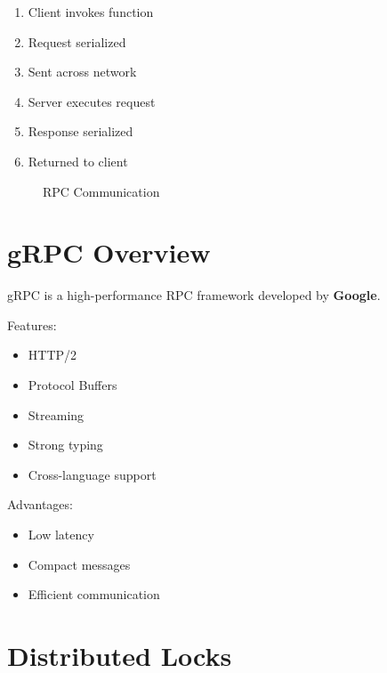 \begin{enumerate}
\item Client invokes function
\item Request serialized
\item Sent across network
\item Server executes request
\item Response serialized
\item Returned to client
\end{enumerate}

\begin{figure}[H]
\centering
{}
\caption{RPC Communication}
\end{figure}

\section{gRPC Overview}

gRPC is a high-performance RPC framework developed by \textbf{Google}.

Features:

\begin{itemize}
\item HTTP/2
\item Protocol Buffers
\item Streaming
\item Strong typing
\item Cross-language support
\end{itemize}

Advantages:

\begin{itemize}
\item Low latency
\item Compact messages
\item Efficient communication
\end{itemize}

\section{Distributed Locks}

